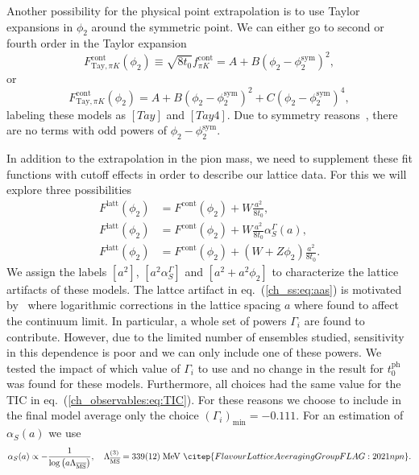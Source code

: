 Another possibility for the physical point extrapolation is to use Taylor expansions in $\phi_2$ around the symmetric point. We can either go to second or fourth order in the Taylor expansion
\begin{equation}
\label{ch_ss:eq:Tay}
F_{\textrm{Tay},\pi K}^{\textrm{cont}}(\phi_2)\equiv\sqrt{8t_0}f_{\pi K}^{\textrm{cont}}=A+B\left(\phi_2-\phi_2^{\textrm{sym}}\right)^2,
\end{equation}
or
\begin{equation}
\label{ch_ss:eq:Tay4}
F_{\textrm{Tay},\pi K}^{\textrm{cont}}(\phi_2)=A+B\left(\phi_2-\phi_2^{\textrm{sym}}\right)^2+C\left(\phi_2-\phi_2^{\textrm{sym}}\right)^4,
\end{equation}
labeling these models as $[Tay]$ and $[Tay4]$. Due to symmetry reasons~\citep{Bietenholz:2011qq}, there are no terms with odd powers of $\phi_2-\phi_2^{\textrm{sym}}$.

In addition to the extrapolation in the pion mass, we need to supplement these fit functions with cutoff effects in order to describe our lattice data. For this we will explore three possibilities
\begin{align}
\label{ch_ss:eq:a2}
F^{\textrm{latt}}(\phi_2)&=F^{\textrm{cont}}(\phi_2)+W\frac{a^2}{8t_0},\\
\label{ch_ss:eq:aas}
F^{\textrm{latt}}(\phi_2)&=F^{\textrm{cont}}(\phi_2)+W\frac{a^2}{8t_0}\alpha_S^{\Gamma}(a),\\
\label{ch_ss:eq:a2phi2}
F^{\textrm{latt}}(\phi_2)&=F^{\textrm{cont}}(\phi_2)+\left(W+Z\phi_2\right)\frac{a^2}{8t_0}.
\end{align}
We assign the labels $[a^2]$, $[a^2\alpha_S^{\Gamma}]$ and $[a^2+a^2\phi_2]$ to characterize the lattice artifacts of these models. The lattce artifact in eq.~(\ref{ch_ss:eq:aas}) is motivated by~\citep{Husung:2022kvi} where logarithmic corrections in the lattice spacing $a$ where found to affect the continuum limit. In particular, a whole set of powers $\Gamma_i$ are found to contribute. However, due to the limited number of ensembles studied, sensitivity in this dependence is poor and we can only include one of these powers. We tested the impact of which value of $\Gamma_i$ to use and no change in the result for $t_0^{\textrm{ph}}$ was found for these models. Furthermore, all choices had the same value for the TIC in eq.~(\ref{ch_observables:eq:TIC}). For these reasons we choose to include in the final model average only the choice $\left(\Gamma_i\right)_{\textrm{min}}=-0.111$. For an estimation of $\alpha_S(a)$ we use
\begin{gather}
\alpha_S(a)\propto-\frac{1}{\textrm{log}\left(a\Lambda_{\overline{\textrm{MS}}}\right)}, \quad \Lambda_{\overline{\textrm{MS}}}^{(3)}=339(12)\;\textrm{MeV}~\citep{FlavourLatticeAveragingGroupFLAG:2021npn}.
\end{gather}

